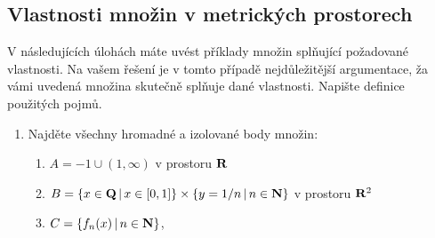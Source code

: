 \subsection{Vlastnosti množin v metrických prostorech}
V následujících úlohách máte uvést příklady množin splňující požadované vlastnosti. Na vašem řešení je
v tomto případě nejdůležitější argumentace, ža vámi uvedená množina skutečně splňuje dané vlastnosti.
Napište definice použitých pojmů.
\begin{enumerate}
 \item Najděte všechny hromadné a izolované body množin:
        \begin{enumerate}
                \item $A={-1}\cup(1,\infty)$ v prostoru ${\rm\bf R}$
                \item $B=\{x\in {\rm\bf Q}\,|\, x\in[0,1]\}\times\{y=1/n\,|\, n\in{\rm\bf N}\}$ v prostoru ${\rm\bf R}^2$
                \item $C=\{f_n(x)\,|\, n\in {\rm\bf N}\}$,
                

\end{enumerate}
\end{enumerate}
